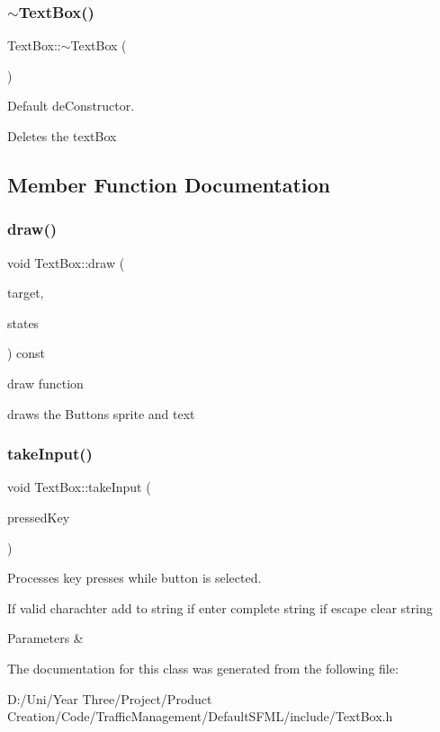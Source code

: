 \subsubsection{\texorpdfstring{$\sim$\+Text\+Box()}{~TextBox()}}
{\footnotesize\ttfamily Text\+Box\+::$\sim$\+Text\+Box (\begin{DoxyParamCaption}{ }\end{DoxyParamCaption})}



Default de\+Constructor. 

Deletes the text\+Box 

\subsection{Member Function Documentation}
\hypertarget{class_text_box_a94f8b1fa218dabaaf892388cbf8df1fa}{}\label{class_text_box_a94f8b1fa218dabaaf892388cbf8df1fa} 
\subsubsection{\texorpdfstring{draw()}{draw()}}
{\footnotesize\ttfamily void Text\+Box\+::draw (\begin{DoxyParamCaption}\item[{Render\+Target \&}]{target,  }\item[{Render\+States}]{states }\end{DoxyParamCaption}) const}



draw function 

draws the Buttons sprite and text \hypertarget{class_text_box_a9139c31dc807fa0c478215086f3fc7f1}{}\label{class_text_box_a9139c31dc807fa0c478215086f3fc7f1} 
\subsubsection{\texorpdfstring{take\+Input()}{takeInput()}}
{\footnotesize\ttfamily void Text\+Box\+::take\+Input (\begin{DoxyParamCaption}\item[{Keyboard\+::\+Key}]{pressed\+Key }\end{DoxyParamCaption})}



Processes key presses while button is selected. 

If valid charachter add to string if enter complete string if escape clear string


\begin{DoxyParams}{Parameters}
{\em } & \\
\hline
\end{DoxyParams}


The documentation for this class was generated from the following file\+:\begin{DoxyCompactItemize}
\item 
D\+:/\+Uni/\+Year Three/\+Project/\+Product Creation/\+Code/\+Traffic\+Management/\+Default\+S\+F\+M\+L/include/Text\+Box.\+h\end{DoxyCompactItemize}
